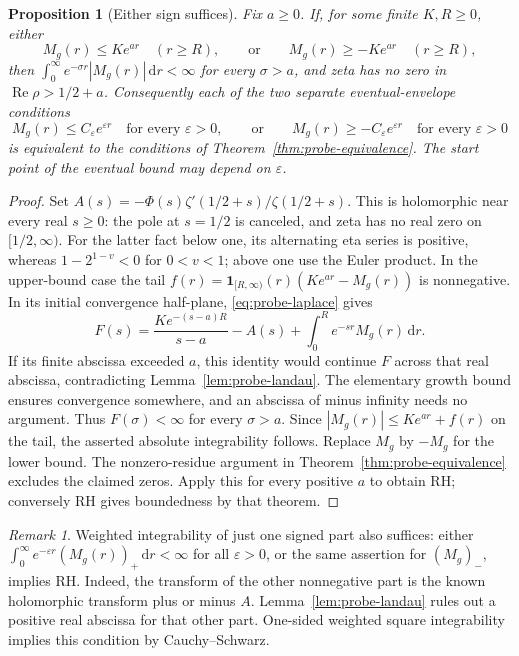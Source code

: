 \documentclass[11pt]{article}
\numberwithin{equation}{section}
\newtheorem{proposition}[theorem]{Proposition}
\theoremstyle{definition}
\theoremstyle{remark}
\newtheorem{remark}[theorem]{Remark}
\newcommand{\Rea}{\operatorname{Re}}
\newcommand{\dd}{\,\mathrm d}
\begin{document}
\begin{proposition}[Either sign suffices]\label{prop:probe-one-sided}
Fix \(a\ge0\). If, for some finite \(K,R\ge0\), either
\[
 M_g(r)\le Ke^{ar}\quad(r\ge R),\qquad\text{or}\qquad
 M_g(r)\ge-Ke^{ar}\quad(r\ge R),
\]
then \(\int_0^\infty e^{-\sigma r}|M_g(r)|\dd r<\infty\) for every
\(\sigma>a\), and zeta has no zero in \(\Rea\rho>1/2+a\).
Consequently each of the two separate eventual-envelope conditions
\[
 M_g(r)\le C_\varepsilon e^{\varepsilon r}
 \quad\text{for every }\varepsilon>0,
 \qquad\text{or}\qquad
 M_g(r)\ge-C_\varepsilon e^{\varepsilon r}
 \quad\text{for every }\varepsilon>0
\]
is equivalent to the conditions of Theorem~\ref{thm:probe-equivalence}.
The start point of the eventual bound may depend on \(\varepsilon\).
\end{proposition}
\begin{proof}
Set \(A(s)=-\Phi(s)\zeta'(1/2+s)/\zeta(1/2+s)\).
This is holomorphic near every real \(s\ge0\): the pole at \(s=1/2\)
is canceled, and zeta has no real zero on \([1/2,\infty)\).
For the latter fact below one, its alternating eta series is positive,
whereas \(1-2^{1-v}<0\) for \(0<v<1\); above one use the Euler product.
In the upper-bound case the tail
\(f(r)=\mathbf1_{[R,\infty)}(r)(Ke^{ar}-M_g(r))\) is nonnegative.
In its initial convergence half-plane, \eqref{eq:probe-laplace} gives
\begin{equation}\label{eq:probe-positive-tail-transform}
 F(s)=\frac{Ke^{-(s-a)R}}{s-a}-A(s)
                   +\int_0^R e^{-sr}M_g(r)\dd r.
\end{equation}
If its finite abscissa exceeded \(a\), this identity would continue
\(F\) across that real abscissa, contradicting Lemma~\ref{lem:probe-landau}.
The elementary growth bound ensures convergence somewhere, and an
abscissa of minus infinity needs no argument. Thus \(F(\sigma)<\infty\)
for every \(\sigma>a\). Since \(|M_g(r)|\le Ke^{ar}+f(r)\) on the
tail, the asserted absolute integrability follows. Replace \(M_g\) by
\(-M_g\) for the lower bound. The nonzero-residue argument in
Theorem~\ref{thm:probe-equivalence} excludes the claimed zeros.
Apply this for every positive \(a\) to obtain RH; conversely RH gives
boundedness by that theorem.
\end{proof}

\begin{remark}\label{rem:probe-one-sided-integral}
Weighted integrability of just one signed part also suffices: either
\(\int_0^\infty e^{-\varepsilon r}(M_g(r))_+\dd r<\infty\) for all
\(\varepsilon>0\), or the same assertion for \((M_g)_-\), implies RH.
Indeed, the transform of the other nonnegative part is the known
holomorphic transform plus or minus \(A\). Lemma~\ref{lem:probe-landau}
rules out a positive real abscissa for that other part. One-sided
weighted square integrability implies this condition by Cauchy--Schwarz.
\end{remark}
\end{document}
